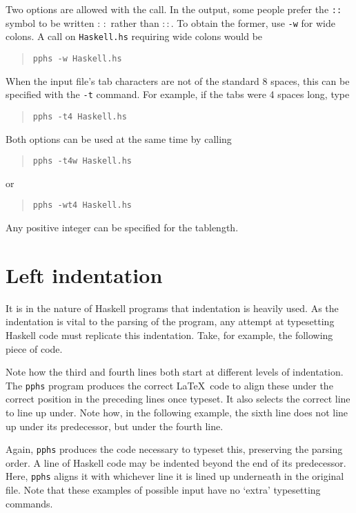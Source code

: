 Two options are allowed with the call.  In the output, some people prefer \label{wide-colons}
the {\tt ::} symbol to be written $:\,:$ rather than $::$.  To obtain the former, use
{\tt -w} for wide colons.  A call on {\tt Haskell.hs} requiring wide colons would be
\begin{quote}
\tt pphs -w Haskell.hs
\end{quote}
When the input file's tab characters are not of the standard 8 spaces, this can be
specified with the {\tt -t} command.  For example, if the tabs were 4 spaces long, type
\begin{quote}
\tt pphs -t4 Haskell.hs
\end{quote}
Both options can be used at the same time by calling
\begin{quote}
\tt pphs -t4w Haskell.hs
\end{quote}
or
\begin{quote}
\tt pphs -wt4 Haskell.hs
\end{quote}
Any positive integer can be specified for the tablength.

\section{Left indentation}

It is in the nature of Haskell programs that indentation is heavily used.  As the
indentation is vital to the parsing of the program, any attempt at typesetting
Haskell code must replicate this indentation.  Take, for example, the following piece of code.
\begin{quote}

\end{quote}
Note how the third and fourth lines both start at different levels of indentation.
The {\tt pphs} program produces the correct \LaTeX\ code to align these under the
correct position in the preceding lines once typeset.  It also selects the correct
line to line up under.  Note how, in the following example, the sixth line does not line up
under its predecessor, but under the fourth line.
\begin{quote}

\end{quote}
Again, {\tt pphs} produces the code necessary to typeset this, preserving the parsing
order.  A line of Haskell code may be indented beyond the end of its predecessor.
Here, {\tt pphs} aligns it with whichever line it is lined up underneath in the
original file.  Note that these
examples of possible input have no `extra' typesetting commands.

